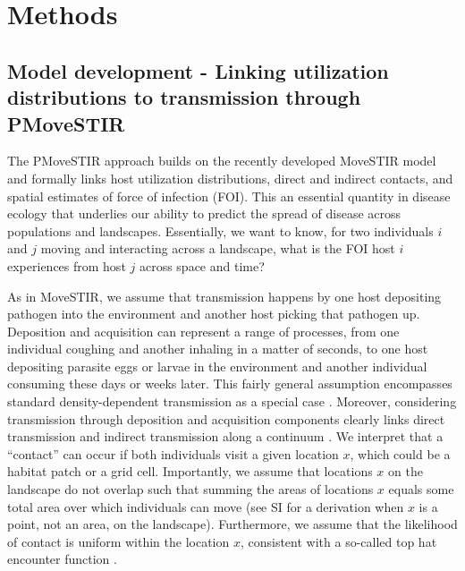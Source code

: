 \documentclass[letterpaper]{article}
\begin{document}
\section*{Methods}

\subsection*{Model development - Linking utilization distributions to transmission through PMoveSTIR}

The PMoveSTIR approach builds on the recently developed MoveSTIR model \citep{Wilber2022} and formally links host utilization distributions, direct and indirect contacts, and spatial estimates of force of infection (FOI). This an essential quantity in disease ecology that underlies our ability to predict the spread of disease across populations and landscapes. Essentially, we want to know, for two individuals $i$ and $j$ moving and interacting across a landscape, what is the FOI host $i$ experiences from host $j$ across space and time?  

As in MoveSTIR, we assume that transmission happens by one host depositing pathogen into the environment and another host picking that pathogen up. 
Deposition and acquisition can represent a range of processes, from one individual coughing and another inhaling in a matter of seconds, to one host depositing parasite eggs or larvae in the environment and another individual consuming these  days or weeks later. 
This fairly general assumption encompasses standard density-dependent transmission as a special case \citep{Cortez2021}. 
Moreover, considering transmission through deposition and acquisition components clearly links direct transmission and indirect transmission along a continuum \citep{Wilber2022}.
We interpret that a ``contact'' can occur if both individuals visit a given location $x$, which could be a habitat patch or a grid cell. 
Importantly, we assume that locations $x$ on the landscape do not overlap such that summing the areas of locations $x$ equals some total area over which individuals can move (see SI for a derivation when $x$ is a point, not an area, on the landscape). 
Furthermore, we assume that the likelihood of contact is uniform within the location $x$, consistent with a so-called top hat encounter function \citep{Gurarie2013,Wilber2022}.
\end{document}
